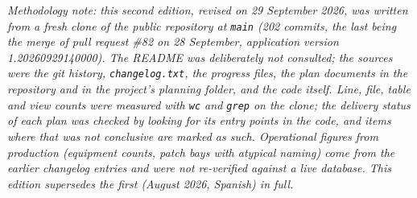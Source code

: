 \documentclass[10.4pt,twocolumn]{article}
\begin{document}
\vspace{0.35em}
{\footnotesize\color{BDgray}
\textit{Methodology note: this second edition, revised on 29 September 2026, was written from a fresh clone of the public repository at \texttt{main} (202 commits, the last being the merge of pull request \#82 on 28 September, application version 1.20260929140000). The README was deliberately not consulted; the sources were the git history, \texttt{changelog.txt}, the progress files, the plan documents in the repository and in the project's planning folder, and the code itself. Line, file, table and view counts were measured with \texttt{wc} and \texttt{grep} on the clone; the delivery status of each plan was checked by looking for its entry points in the code, and items where that was not conclusive are marked as such. Operational figures from production (equipment counts, patch bays with atypical naming) come from the earlier changelog entries and were not re-verified against a live database. This edition supersedes the first (August 2026, Spanish) in full.}
}
\end{document}
